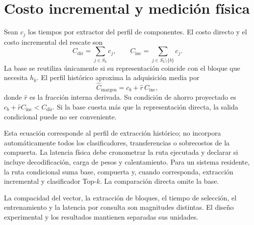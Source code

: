 \section{Costo incremental y medición física}
Sean \(c_j\) los tiempos por extractor del perfil de componentes. El costo directo y el costo incremental del rescate son
\begin{equation}
C_{\mathrm{dir}}=\sum_{j\in S_k}c_j,\qquad
C_{\mathrm{inc}}=\sum_{j\in S_k\setminus\{b\}}c_j.
\label{eq:tk-incremental}
\end{equation}
La base se reutiliza únicamente si su representación coincide con el bloque que necesita \(h_k\). El perfil histórico aproxima la adquisición media por
\begin{equation}
\widehat C_{\mathrm{margen}}=c_b+\widehat r\,C_{\mathrm{inc}},
\label{eq:tk-cost}
\end{equation}
donde \(\widehat r\) es la fracción interna derivada. Su condición de ahorro proyectado es \(c_b+\widehat r C_{\mathrm{inc}}<C_{\mathrm{dir}}\). Si la base cuesta más que la representación directa, la salida condicional puede no ser conveniente.

Esta ecuación corresponde al perfil de extracción histórico; no incorpora automáticamente todos los clasificadores, transferencias o sobrecostos de la compuerta. La latencia física debe cronometrar la ruta ejecutada y declarar si incluye decodificación, carga de pesos y calentamiento. Para un sistema residente, la ruta condicional suma base, compuerta y, cuando corresponda, extracción incremental y clasificador Top-\(k\). La comparación directa omite la base.

La compacidad del vector, la extracción de bloques, el tiempo de selección, el entrenamiento y la latencia por consulta son magnitudes distintas. El diseño experimental y los resultados mantienen separadas sus unidades.
